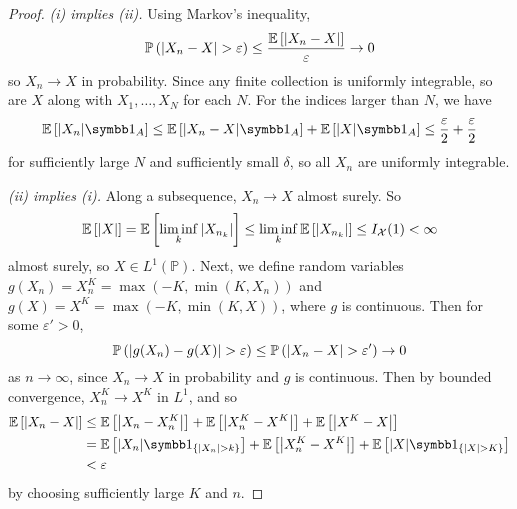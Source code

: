 \begin{proof}
	\emph{(i) implies (ii).}
	Using Markov's inequality,
	\[ \mathbb{P}\left({\abs{X_n - X} > \varepsilon}\right) \leq \frac{\mathbb{E}\left[{\abs{X_n - X}}\right]}{\varepsilon} \to 0 \]
	so \( X_n \to X \) in probability.
	Since any finite collection is uniformly integrable, so are \( X \) along with \( X_1, \dots, X_N \) for each \( N \).
	For the indices larger than \( N \), we have
	\[ \expect{\abs{X_n} \symbb 1_A} \leq \expect{\abs{X_n - X} \symbb 1_A} + \expect{\abs{X} \symbb 1_A} \leq \frac{\varepsilon}{2} + \frac{\varepsilon}{2} \]
	for sufficiently large \( N \) and sufficiently small \( \delta \), so all \( X_n \) are uniformly integrable.

	\emph{(ii) implies (i).}
	Along a subsequence, \( X_n \to X \) almost surely.
	So
	\[ \mathbb{E}\left[{\abs{X}}\right] = \mathbb{E}\left[{\liminf_k \abs{X_{n_k}}}\right] \leq \liminf_k \mathbb{E}\left[{\abs{X_{n_k}}}\right] \leq I_{\mathcal X}(1) < \infty \]
	almost surely, so \( X \in L^1(\mathbb P) \).
	Next, we define random variables \( g(X_n) = X_n^K = \max(-K, \min(K, X_n)) \) and \( g(X) = X^K = \max(-K, \min(K, X)) \), where \( g \) is continuous.
	Then for some \( \varepsilon' > 0 \),
	\[ \mathbb{P}\left({\abs{g(X_n) - g(X)} > \varepsilon}\right) \leq \mathbb{P}\left({\abs{X_n - X} > \varepsilon'}\right) \to 0 \]
	as \( n \to \infty \), since \( X_n \to X \) in probability and \( g \) is continuous.
	Then by bounded convergence, \( X_n^K \to X^K \) in \( L^1 \), and so
	\begin{align*}
		\expect{\abs{X_n - X}} &\leq \expect{\abs{X_n - X_n^K}} + \expect{\abs{X_n^K - X^K}} + \expect{\abs{X^K - X}} \\
		&= \expect{\abs{X_n} \symbb 1_{\qty{\abs{X_n} > k}}} + \expect{\abs{X_n^K - X^K}} + \expect{\abs{X}\symbb 1_{\qty{\abs{X} > K}}} \\
		&< \varepsilon
	\end{align*}
	by choosing sufficiently large \( K \) and \( n \).
\end{proof}
